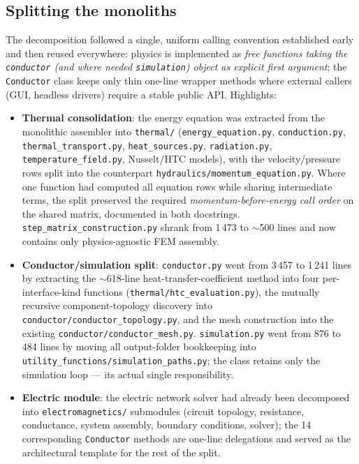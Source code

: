 \documentclass[11pt,a4paper]{article}
\newcommand{\code}[1]{\texttt{#1}}
\begin{document}
\subsection{Splitting the monoliths}

The decomposition followed a single, uniform calling convention established early and
then reused everywhere: physics is implemented as \emph{free functions taking the
\code{conductor} (and where needed \code{simulation}) object as explicit first
argument}; the \code{Conductor} class keeps only thin one-line wrapper methods where
external callers (GUI, headless drivers) require a stable public API. Highlights:

\begin{itemize}
  \item \textbf{Thermal consolidation}: the energy equation was extracted from the
        monolithic assembler into \code{thermal/} (\code{energy\_equation.py},
        \code{conduction.py}, \code{thermal\_transport.py}, \code{heat\_sources.py},
        \code{radiation.py}, \code{temperature\_field.py}, Nusselt/HTC models), with the
        velocity/pressure rows split into the counterpart
        \code{hydraulics/momentum\_equation.py}. Where one function had computed all
        equation rows while sharing intermediate terms, the split preserved the required
        \emph{momentum-before-energy call order} on the shared matrix, documented in both
        docstrings. \code{step\_matrix\_construction.py} shrank from 1\,473 to
        $\sim$500 lines and now contains only physics-agnostic FEM assembly.
  \item \textbf{Conductor/simulation split}: \code{conductor.py} went from 3\,457 to
        1\,241 lines by extracting the $\sim$618-line heat-transfer-coefficient method
        into four per-interface-kind functions (\code{thermal/htc\_evaluation.py}), the
        mutually recursive component-topology discovery into
        \code{conductor/conductor\_topology.py}, and the mesh construction into the
        existing \code{conductor/conductor\_mesh.py}. \code{simulation.py} went from 876
        to 484 lines by moving all output-folder bookkeeping into
        \code{utility\_functions/simulation\_paths.py}; the class retains only the
        simulation loop --- its actual single responsibility.
  \item \textbf{Electric module}: the electric network solver had already been
        decomposed into \code{electromagnetics/} submodules (circuit topology,
        resistance, conductance, system assembly, boundary conditions, solver); the
        14 corresponding \code{Conductor} methods are one-line delegations and served
        as the architectural template for the rest of the split.
\end{itemize}
\end{document}
